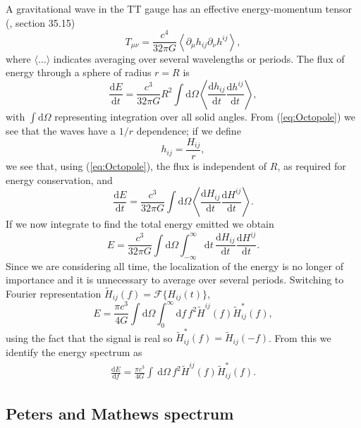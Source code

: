 \documentclass[useAMS,usedcolumn,usegraphicx,usenatbib]{mn2e}
\newcommand{\eqnref}[1]{(\ref{eq:#1})}
\newcommand{\dd}{\ensuremath{\mathrm{d}}}
\newcommand{\diff}[2]{\ensuremath{\frac{\dd {#1}}{\dd {#2}}}}
\newcommand{\intd}[4]{\ensuremath{\int_{#1}^{#2}{#3}\,\dd{#4}}}
\begin{document}
A gravitational wave in the TT gauge has an effective energy-momentum tensor (\citealt{Misner1973}, section 35.15)
\begin{equation}
T_{\mu\nu} = \frac{c^4}{32\pi G}\left\langle\partial_\mu h_{ij} \partial_\nu h^{ij}\right\rangle,
\end{equation}
where $\langle\ldots\rangle$ indicates averaging over several wavelengths or periods. The flux of energy through a sphere of radius $r = R$ is
\begin{equation}
\diff{E}{t} = \frac{c^3}{32\pi G} R^2 \int{\dd\Omega}\left\langle\diff{h_{ij}}{t}\diff{h^{ij}}{t}\right\rangle,
\end{equation}
with $\int{\dd\Omega}$ representing integration over all solid angles. From \eqnref{Octopole} we see that the waves have a $1/{r}$ dependence; if we define
\begin{equation}
h_{ij} = \frac{H_{ij}}{r},
\end{equation}
we see that, using \eqnref{Octopole}, the flux is independent of $R$, as required for energy conservation, and
\begin{equation}
\diff{E}{t} = \frac{c^3}{32\pi G} \int{\dd\Omega}\left\langle\diff{H_{ij}}{t}\diff{H^{ij}}{t}\right\rangle.
\end{equation}
If we now integrate to find the total energy emitted we obtain
\begin{equation}
E = \frac{c^3}{32\pi G} \int{\dd\Omega}\int_{-\infty}^{\infty}{\dd t} \, \diff{H_{ij}}{t}\diff{H^{ij}}{t}.
\end{equation}
Since we are considering all time, the localization of the energy is no longer of importance and it is unnecessary to average over several periods. Switching to Fourier representation $\widetilde{H}_{ij}(f) = \mathscr{F}\{H_{ij}(t)\}$,
\begin{equation}
E = \frac{\pi c^3}{4 G} \int{\dd\Omega}\int_{0}^{\infty}{\dd f} \, f^2 \widetilde{H}^{ij}(f)\widetilde{H}_{ij}^*(f),
\end{equation}
using the fact that the signal is real so $\widetilde{H}_{ij}^*(f) = \widetilde{H}_{ij}(-f)$. From this we identify the energy spectrum as
\begin{align}
\diff{E}{f} = \frac{\pi c^3}{4 G} \intd{}{}{}{\Omega} \, f^2 \widetilde{H}^{ij}(f)\widetilde{H}_{ij}^*(f).
\label{eq:NK_dEdf}
\end{align}

\subsection{Peters and Mathews spectrum}
\end{document}
